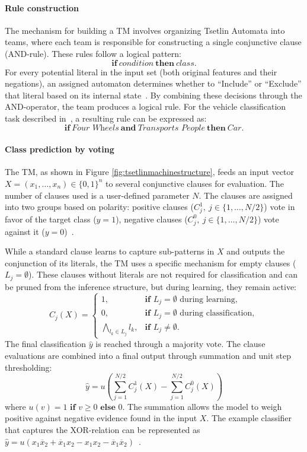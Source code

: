 \paragraph{Rule construction}
The mechanism for building a TM involves organizing Tsetlin Automata into teams, where each team is responsible for constructing a single conjunctive clause (AND-rule). These rules follow a logical pattern:
$$\textbf{if} \ \textit{condition} \ \textbf{then} \ \textit{class} \text{.}$$
For every potential literal in the input set (both original features and their negations), an assigned automaton determines whether to ``Include'' or ``Exclude'' that literal based on its internal state~\cite{granmo2021tsetlinmachinegame}. By combining these decisions through the AND-operator, the team produces a logical rule. For the vehicle classification task described in~\cite{granmo2022tsetlinmachinebookchap1}, a resulting rule can be expressed as: 
$$\textbf{if} \ \textit{Four Wheels} \ \textbf{and} \ \textit{Transports People} \ \textbf{then} \ \textit{Car} \text{.}$$

\paragraph{Class prediction by voting}
The TM, as shown in Figure \ref{fig:tsetlinmachinestructure}, feeds an input vector $X = (x_1, \dots, x_n) \in \{0,1\}^n$ to several conjunctive clauses for evaluation. The number of clauses used is a user-defined parameter $N$. The clauses are assigned into two groups based on polarity: positive clauses ($C_j^1, \ j \in \{1,\dots,N/2\}$) vote in favor of the target class ($y=1$), negative clauses ($C_j^0, \ j \in \{1,\dots,N/2\}$) vote against it ($y=0$)~\cite{granmo2021tsetlinmachinegame}.

While a standard clause learns to capture sub-patterns in $X$ and outputs the conjunction of its literals, the TM uses a specific mechanism for empty clauses ($L_j = \emptyset$). These clauses without literals are not required for classification and can be pruned from the inference structure, but during learning, they remain active:
$$C_j(X) = \begin{cases}
1, & \textbf{if } L_j=\emptyset \text{ during learning},\\
0, & \textbf{if } L_j=\emptyset \text{ during classification},\\
\bigwedge_{l_k \in L_j}l_k, & \textbf{if } L_j\neq\emptyset \text{.}
\end{cases}$$
The final classification $\hat{y}$ is reached through a majority vote. The clause evaluations are combined into a final output through summation and unit step thresholding:
$$\hat{y} = u \left( \sum_{j=1}^{N/2}C_j^1(X) - \sum_{j=1}^{N/2}C_j^0(X) \right)$$
where $u(v) = 1 \textbf{ if } v \ge 0 \textbf{ else } 0$. The summation allows the model to weigh positive against negative evidence found in the input $X$. The example classifier that captures the XOR-relation can be represented as $\hat{y} = u(x_1\overline{x}_2 + \overline{x}_1x_2 - x_1x_2 - \overline{x}_1\overline{x}_2)$~\cite{granmo2021tsetlinmachinegame}.


